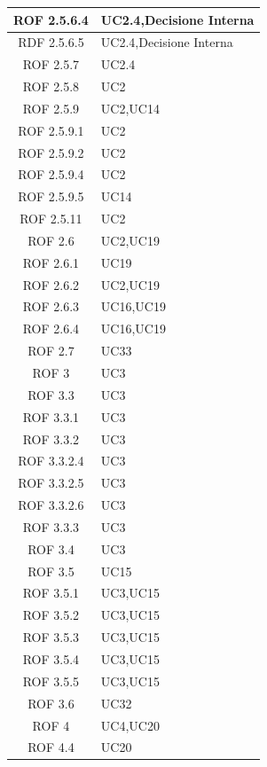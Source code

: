\begin{center}
\begin{longtable}[c]{|c|m{}|}
\hline
ROF 2.5.6.4 & UC2.4,Decisione Interna \\
\hline
\rowcolor{grigio}RDF 2.5.6.5 & UC2.4,Decisione Interna \\
\hline
ROF 2.5.7 & UC2.4 \\
\hline
\rowcolor{grigio}ROF 2.5.8 & UC2 \\
\hline
ROF 2.5.9 & UC2,UC14 \\
\hline
\rowcolor{grigio}ROF 2.5.9.1 & UC2 \\
\hline
ROF 2.5.9.2 & UC2 \\
\hline
\rowcolor{grigio}ROF 2.5.9.4 & UC2 \\
\hline
ROF 2.5.9.5 & UC14 \\
\hline
\rowcolor{grigio}ROF 2.5.11 & UC2 \\
\hline
ROF 2.6 & UC2,UC19 \\
\hline
\rowcolor{grigio}ROF 2.6.1 & UC19 \\
\hline
ROF 2.6.2 & UC2,UC19 \\
\hline
\rowcolor{grigio}ROF 2.6.3 & UC16,UC19 \\
\hline
ROF 2.6.4 & UC16,UC19 \\
\hline
\rowcolor{grigio}ROF 2.7 & UC33 \\
\hline
ROF 3 & UC3 \\
\hline
\rowcolor{grigio}ROF 3.3 & UC3 \\
\hline
ROF 3.3.1 & UC3 \\
\hline
\rowcolor{grigio}ROF 3.3.2 & UC3 \\
\hline
ROF 3.3.2.4 & UC3 \\
\hline
\rowcolor{grigio}ROF 3.3.2.5 & UC3 \\
\hline
ROF 3.3.2.6 & UC3 \\
\hline
\rowcolor{grigio}ROF 3.3.3 & UC3 \\
\hline
ROF 3.4 & UC3 \\
\hline
\rowcolor{grigio}ROF 3.5 & UC15 \\
\hline
ROF 3.5.1 & UC3,UC15 \\
\hline
\rowcolor{grigio}ROF 3.5.2 & UC3,UC15 \\
\hline
ROF 3.5.3 & UC3,UC15 \\
\hline
\rowcolor{grigio}ROF 3.5.4 & UC3,UC15 \\
\hline
ROF 3.5.5 & UC3,UC15 \\
\hline
\rowcolor{grigio}ROF 3.6 & UC32 \\
\hline
ROF 4 & UC4,UC20 \\
\hline
\rowcolor{grigio}ROF 4.4 & UC20 \\

\end{longtable}
\end{center}
